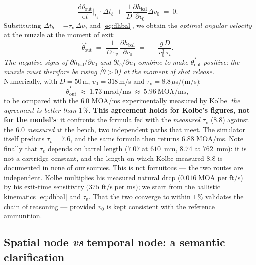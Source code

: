 \documentclass[12pt,a4paper]{article}
\begin{document}
	\begin{equation}
		\label{eq:compensation}
		\boxed{\;\frac{\mathrm{d}\theta_\text{out}}{\mathrm{d}t}\bigg|_{t_b}\cdot \Delta t_b \;+\; \frac{1}{D}\frac{\partial h_\text{bal}}{\partial v_0}\Delta v_0 \;=\; 0.\;}
	\end{equation}
	Substituting $\Delta t_b = -\tau_v\,\Delta v_0$ and \eqref{eq:dhbal}, we obtain the \emph{optimal angular velocity} at the muzzle at the moment of exit:
	\begin{equation}
		\label{eq:dthetaopt}
		\dot \theta_\text{out}^\star \;=\; \frac{1}{D\,\tau_v}\,\frac{\partial h_\text{bal}}{\partial v_0} \;=\; -\,\frac{g\,D}{v_0^3\,\tau_v}.
	\end{equation}
	\emph{The negative signs of $\partial h_\text{bal}/\partial v_0$ and $\partial t_b/\partial v_0$ combine to make $\dot\theta_\text{out}^\star$ positive: the muzzle must therefore be rising ($\dot\theta>0$) at the moment of shot release.} Numerically, with $D=50$\,m, $v_0 = 318$\,m/s and $\tau_v = 8.8\,\mu$s/(m/s):
	\begin{equation*}
		\dot\theta_\text{out}^\star \;\approx\; 1.73\ \text{mrad/ms} \;\approx\; 5.96\ \text{MOA/ms},
	\end{equation*}
	to be compared with the $6.0$ MOA/ms experimentally measured by Kolbe: \emph{the agreement is better than} $1\,\%$. \textbf{This agreement holds for Kolbe's figures, not for the model's}: it confronts the formula fed with the \emph{measured} $\tau_v$ ($8.8$) against the $6.0$ \emph{measured} at the bench, two independent paths that meet. The simulator itself predicts $\tau_v = 7.6$, and the same formula then returns $6.88$ MOA/ms. Note finally that $\tau_v$ depends on barrel length ($7.07$ at $610$~mm, $8.74$ at $762$~mm): it is not a cartridge constant, and the length on which Kolbe measured $8.8$ is documented in none of our sources. This is not fortuitous --- the two routes are independent. Kolbe multiplies his measured natural drop ($0.016$ MOA per ft/s) by his exit-time sensitivity ($375$ ft/s per ms); we start from the ballistic kinematics \eqref{eq:dhbal} and $\tau_v$. That the two converge to within $1\,\%$ validates the chain of reasoning --- provided $v_0$ is kept consistent with the reference ammunition.

	\subsection{Spatial node \emph{vs} temporal node: a semantic clarification}
	\label{sec:nodes}
\end{document}

